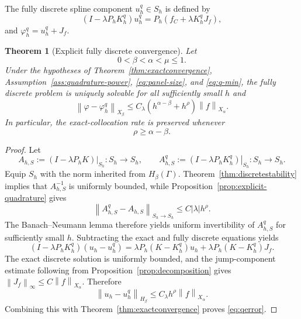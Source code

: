 \documentclass[11pt,a4paper]{amsart}
\theoremstyle{plain}
\newtheorem{theorem}{Theorem}[section]
\theoremstyle{definition}
\theoremstyle{remark}
\newcommand{\Ga}{\Gamma}
\newcommand{\norm}[1]{\left\|#1\right\|}
\begin{document}
The fully discrete spline component $u_h^q\in S_h$ is defined by
\begin{equation}\label{eq:fullydiscrete}
        \left(I-\lambda P_hK_h^q\right)u_h^q
        =
        P_h\left(f_C+\lambda K_h^qJ_f\right),
\end{equation}
and $\varphi_h^q=u_h^q+J_f$.

\begin{theorem}[Explicit fully discrete convergence]
\label{thm:quadrature}
Let
\[
        0<\beta<\alpha<\mu\le1.
\]
Under the hypotheses of Theorem~\ref{thm:exactconvergence},
Assumption~\ref{ass:quadrature-power}, \eqref{eq:panel-size}, and
\eqref{eq:q-min}, the fully discrete problem is uniquely solvable for all
sufficiently small $h$ and
\begin{equation}\label{eq:qerror}
        \norm{\varphi-\varphi_h^q}_{X_\beta}
        \le
        C_\lambda
        \left(h^{\alpha-\beta}+h^\rho\right)
        \norm{f}_{X_\alpha}.
\end{equation}
In particular, the exact-collocation rate is preserved whenever
\begin{equation}\label{eq:rho-condition}
        \rho\ge\alpha-\beta.
\end{equation}
\end{theorem}

\begin{proof}
Let
\[
        A_{h,S}:=\left.(I-\lambda P_hK)\right|_{S_h}:S_h\to S_h,
        \qquad
        A_{h,S}^q:=\left.(I-\lambda P_hK_h^q)\right|_{S_h}:S_h\to S_h.
\]
Equip $S_h$ with the norm inherited from $H_\beta(\Ga)$.  Theorem~\ref{thm:discretestability} implies that $A_{h,S}^{-1}$ is uniformly bounded, while Proposition~\ref{prop:explicit-quadrature} gives
\[
        \norm{A_{h,S}^q-A_{h,S}}_{S_h\to S_h}
        \le C|\lambda|h^\rho.
\]
The Banach--Neumann lemma therefore yields uniform invertibility of $A_{h,S}^q$ for sufficiently small $h$.  Subtracting the exact and fully discrete equations yields
\[
 \left(I-\lambda P_hK_h^q\right)(u_h-u_h^q)
 =
 \lambda P_h(K-K_h^q)u_h
 +
 \lambda P_h(K-K_h^q)J_f.
\]
The exact discrete solution is uniformly bounded, and the jump-component
estimate following from Proposition~\ref{prop:decomposition} gives
$\norm{J_f}_\infty\le C\norm{f}_{X_\alpha}$.  Therefore
\[
        \norm{u_h-u_h^q}_{H_\beta}
        \le
        C_\lambda h^\rho\norm{f}_{X_\alpha}.
\]
Combining this with Theorem~\ref{thm:exactconvergence} proves
\eqref{eq:qerror}.
\end{proof}
\end{document}
